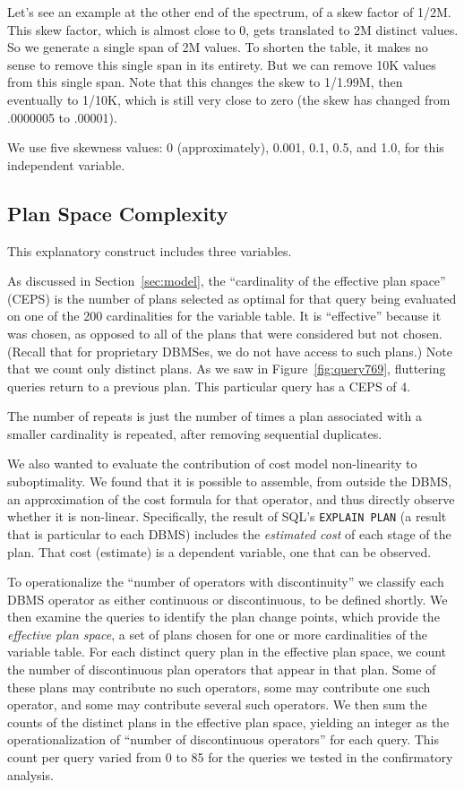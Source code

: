 \documentclass[prodmode,acmtods]{acmsmall}
\begin{document}
Let's see an example at the other end of the spectrum, of a skew factor of
1/2M.  This skew factor, which is almost close to 0, gets translated to 2M
distinct values.  So we generate a single span of 2M values.  To shorten the
table, it makes no sense to remove this single span in its entirety. But we
can remove 10K values from this single span.  Note that this changes the
skew to 1/1.99M, then eventually to 1/10K, which is still very close to zero
(the skew has changed from .0000005 to .00001).

We use five skewness values: 0 (approximately), 0.001, 0.1, 0.5, and 1.0,
for this independent variable.

\subsection{Plan Space Complexity}\label{sec:discontinuity}

This explanatory construct includes three variables.

As discussed in Section~\ref{sec:model}, the ``cardinality of the effective plan
space'' (CEPS) is the number of plans selected as optimal for that query
being evaluated on one of the 200 cardinalities for the variable table. It
is ``effective'' because it was chosen, as opposed to all of the
plans that were considered but not chosen. (Recall that for proprietary
\hbox{DBMSes}, we do not have access to such plans.) Note that we count only
distinct plans. As we saw in Figure~\ref{fig:query769}, fluttering queries
return to a previous plan. This particular query has a CEPS of 4.

The number of repeats is just the number of times a plan associated with a
smaller cardinality is repeated, after removing sequential
duplicates. 

We also wanted to evaluate the contribution of cost model non-linearity to
suboptimality. We found that it is possible to assemble, from outside the
\hbox{DBMS}, an approximation of the cost formula for that operator, and thus
directly observe whether it is non-linear. Specifically, the result of SQL's
{\tt EXPLAIN PLAN} (a result that is particular to each \hbox{DBMS}) includes the
{\em estimated cost} of each stage of the plan. That cost (estimate) is a
dependent variable, one that can be observed.

To operationalize the ``number of operators with discontinuity'' we
classify each \hbox{DBMS} operator as either continuous or discontinuous, to be
defined shortly.  We then examine the queries
to identify the plan change points, which provide the {\em effective plan
  space}, a set of plans chosen for one or
more cardinalities of the variable table. For each distinct query plan in the
effective plan space, we
count the number of discontinuous plan operators that appear in that plan. Some of
these plans may contribute no such operators, some may contribute one such
operator, and some may contribute several such operators. We then sum the
counts of the distinct plans in the effective plan space, yielding an
integer as the operationalization of ``number of discontinuous operators''
for each query.  This count per query varied from 0 to 85 for the
queries we tested in the confirmatory analysis.
\end{document}
